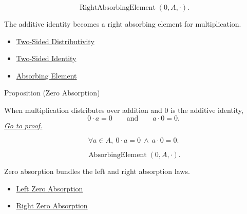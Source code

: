 \begin{remark*}
\[
\operatorname{RightAbsorbingElement}(0,A,\cdot).
\]
\end{remark*}

\begin{remark*}[Interpretation]
The additive identity becomes a right absorbing element for multiplication.
\end{remark*}

\begin{dependencies}
\begin{itemize}
  \item \hyperref[def:two-sided-distributivity]{Two-Sided Distributivity}
  \item \hyperref[def:two-sided-identity]{Two-Sided Identity}
  \item \hyperref[def:absorbing-element]{Absorbing Element}
\end{itemize}
\end{dependencies}

\begin{propositionbox}{Proposition (Zero Absorption)}
\begin{proposition}
\label{prop:zero-absorption}
When multiplication distributes over addition and $0$ is the additive identity,
\[
0\cdot a=0
\qquad\text{and}\qquad
a\cdot 0=0.
\]
\hyperref[prf:zero-absorption]{\textit{Go to proof.}}
\end{proposition}
\end{propositionbox}

\begin{remark*}
\[
\forall a\in A,\ 0\cdot a=0\ \land\ a\cdot 0=0.
\]
\end{remark*}

\begin{remark*}
\[
\operatorname{AbsorbingElement}(0,A,\cdot).
\]
\end{remark*}

\begin{remark*}[Interpretation]
Zero absorption bundles the left and right absorption laws.
\end{remark*}

\begin{dependencies}
\begin{itemize}
  \item \hyperref[prop:left-zero-absorption]{Left Zero Absorption}
  \item \hyperref[prop:right-zero-absorption]{Right Zero Absorption}
\end{itemize}
\end{dependencies}


